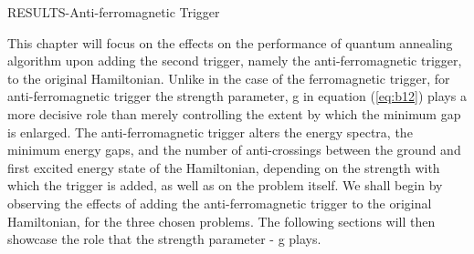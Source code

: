 \documentclass[../main.tex]{subfiles}
\begin{document}
\begin{center}
\begin{Huge}
RESULTS-Anti-ferromagnetic Trigger
\end{Huge}
\end{center}
This chapter will focus on the effects on the performance of quantum annealing algorithm upon adding the second trigger, namely the anti-ferromagnetic trigger, to the original Hamiltonian. Unlike in the case of the ferromagnetic trigger, for anti-ferromagnetic trigger the strength parameter, g in equation (\ref{eq:b12}) plays a more decisive role than merely controlling the extent by which the minimum gap is enlarged. The anti-ferromagnetic trigger alters the energy spectra, the minimum energy gaps, and the number of anti-crossings between the ground and first excited energy state of the Hamiltonian, depending on the strength with which the trigger is added, as well as on the problem itself. We shall begin by observing the effects of adding the anti-ferromagnetic trigger to the original Hamiltonian, for the three chosen problems. The following sections will then showcase the role that the strength parameter - g plays.
\end{document}

